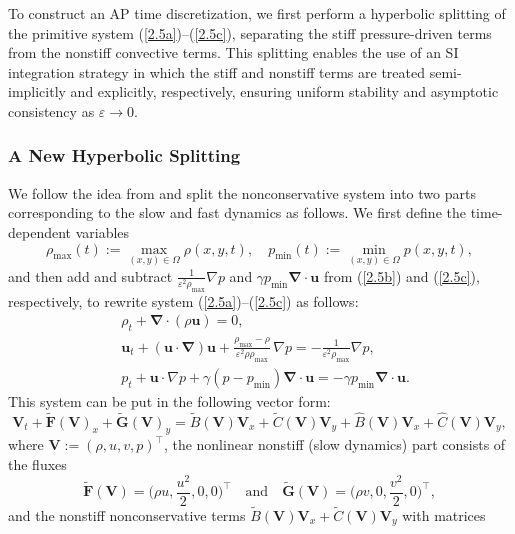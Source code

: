 \documentclass[A4paper,12pt,twoside]{article}
\numberwithin{equation}{section}
\numberwithin{figure}{section}
\numberwithin{table}{section}
\def\bnabla{\bm{\nabla}}
\newcommand{\mF}{\bm{F}}
\newcommand{\mG}{\bm{G}}
\newcommand{\ve}{\varepsilon}
\newcommand\eref[1]{(\ref{#1})}
\begin{document}
To construct an AP time discretization, we first perform a hyperbolic splitting of the primitive system \eref{2.5a}–\eref{2.5c}, separating
the stiff pressure-driven terms from the nonstiff convective terms. This splitting enables the use of an SI integration strategy in which
the stiff and nonstiff terms are treated semi-implicitly and explicitly, respectively, ensuring uniform stability and asymptotic consistency
as $\ve\to0$.

\subsubsection{A New Hyperbolic Splitting}
We follow the idea from \cite{haack2012all,LCK} and split the nonconservative system into two parts corresponding to the slow and fast
dynamics as follows. We first define the time-dependent variables 
\begin{equation}
\rho_{\max}(t):=\max\limits_{(x,y)\in\Omega}\rho(x,y,t),\quad p_{\min}(t):=\min\limits_{(x,y)\in\Omega}p(x,y,t),
\label{4.3}
\end{equation}
and then add and subtract $\frac{1}{\ve^2\rho_{\max}}\nabla p$ and $\gamma p_{\min}\bnabla\cdot\bm u$ from \eref{2.5b} and \eref{2.5c},
respectively, to rewrite system \eref{2.5a}--\eref{2.5c} as follows:
\begin{align}
&\rho_t+\bnabla\!\cdot\!(\rho\bm u)=0,\label{2.1}\\
&\bm u_t+(\bm u\!\cdot\!\bnabla)\bm u+\frac{\rho_{\max}-\rho}{\ve^2\rho\rho_{\max}}\,\nabla p=-\frac{1}{\ve^2\rho_{\max}}
\nabla p,\label{2.2}\\[0.5ex]
&p_t+\bm u\!\cdot\!\nabla p+\gamma(p-p_{\min})\bnabla\!\cdot\!\bm u=-\gamma p_{\min}\bnabla\!\cdot\!\bm u.\label{2.3}
\end{align}
This system can be put in the following vector form:
\begin{equation}
\bm V_t+\widetilde{\mF}(\bm V)_x+\widetilde{\mG}(\bm V)_y=\widetilde B(\bm V)\bm V_x+\widetilde C(\bm V)\bm V_y+\widehat B(\bm V)\bm V_x+
\widehat C(\bm V)\bm V_y,
\label{4.47}
\end{equation}
where $\bm V:=(\rho,u,v,p)^\top$, the nonlinear nonstiff (slow dynamics) part consists of the fluxes
\begin{equation*}
\widetilde{\mF}(\bm V)=\Big(\rho u,\frac{u^2}{2},0,0\Big)^\top\quad\mbox{and}\quad
\widetilde{\mG}(\bm V)=\Big(\rho v,0,\frac{v^2}{2},0\Big)^\top,
\end{equation*}
and the nonstiff nonconservative terms $\widetilde B(\bm V)\bm V_x+\widetilde C(\bm V)\bm V_y$ with matrices
\end{document}

